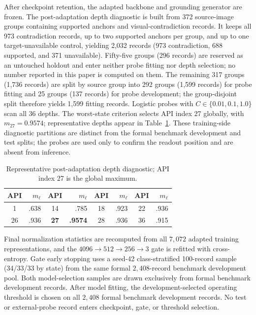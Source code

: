 \documentclass[letterpaper]{article}
\begin{document}
After checkpoint retention, the adapted backbone and grounding generator are frozen. The post-adaptation depth diagnostic is built from 372 source-image groups containing supported anchors and visual-contradiction records. It keeps all 973 contradiction records, up to two supported anchors per group, and up to one target-unavailable control, yielding 2,032 records (973 contradiction, 688 supported, and 371 unavailable). Fifty-five groups (296 records) are reserved as an untouched holdout and enter neither probe fitting nor depth selection; no number reported in this paper is computed on them. The remaining 317 groups (1,736 records) are split by source group into 292 groups (1,599 records) for probe fitting and 25 groups (137 records) for probe development; the group-disjoint split therefore yields 1,599 fitting records. Logistic probes with $C\in\{0.01,0.1,1.0\}$ scan all 36 depths. The worst-state criterion selects API index 27 globally, with $m_{27}=0.9574$; representative depths appear in Table~\ref{tab:depth_scan}. These training-side diagnostic partitions are distinct from the formal benchmark development and test splits; the probes are used only to confirm the readout position and are absent from inference.

\begin{table}[t]
\centering
\small
\setlength{\tabcolsep}{1.6mm}
\begin{tabular}{crcrcrcr}
\toprule
API & $m_\ell$ & API & $m_\ell$ & API & $m_\ell$ & API & $m_\ell$ \\
\midrule
1 & .638 & 14 & .785 & 18 & .923 & 22 & .936 \\
26 & .936 & \textbf{27} & \textbf{.9574} & 28 & .936 & 36 & .915 \\
\bottomrule
\end{tabular}
\caption{Representative post-adaptation depth diagnostic; API index 27 is the global maximum.}
\label{tab:depth_scan}
\end{table}

Final normalization statistics are recomputed from all $7{,}072$ adapted training representations, and the $4096\!\rightarrow\!512\!\rightarrow\!256\!\rightarrow\!3$ gate is refitted with cross-entropy. Gate early stopping uses a seed-42 class-stratified 100-record sample (34/33/33 by state) from the same formal $2{,}408$-record benchmark development pool. Both model-selection samples are drawn exclusively from formal benchmark development records. After model fitting, the development-selected operating threshold is chosen on all $2{,}408$ formal benchmark development records. No test or external-probe record enters checkpoint, gate, or threshold selection.
\end{document}
